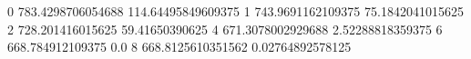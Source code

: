0 783.4298706054688 114.64495849609375
1 743.9691162109375 75.1842041015625
2 728.201416015625 59.41650390625
4 671.3078002929688 2.52288818359375
6 668.784912109375 0.0
8 668.8125610351562 0.02764892578125
